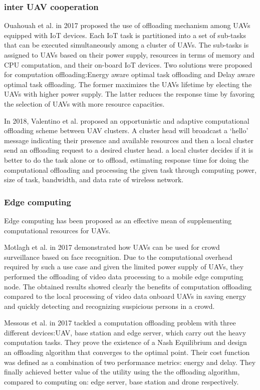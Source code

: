 \documentclass[journal]{IEEEtran}
\begin{document}
\subsubsection{inter UAV cooperation}
Ouahouah et al. in 2017 proposed the use of offloading mechanism among UAVs equipped with IoT devices\cite{Ouahouah2017}.
Each IoT task is partitioned into a set of sub-tasks that can be executed simultaneously among a cluster of UAVs.
The sub-tasks is assigned to UAVs based on their power supply, resources in terms of memory and CPU computation, and their on-board IoT devices.
Two solutions were proposed for  computation offloading:Energy aware optimal task offloading and Delay aware optimal task offloading.
The former maximizes the UAVs lifetime by electing the UAVs with higher power supply.
The latter reduces the response time by favoring the selection of UAVs with more resource capacities.

In 2018, Valentino et al. proposed an opportunistic and adaptive computational offloading scheme between UAV clusters\cite{Valentino2018}.
A cluster head will broadcast a ‘hello’ message indicating their presence and available resources and then a local cluster send an offloading request to a desired cluster head.
a local cluster decides if it is better to do the task alone or to offload, estimating response time for doing the computational offloading and processing the given task through computing power, size of task, bandwidth, and data rate of wireless network.

\subsubsection{Edge computing}
Edge computing has been proposed as an effective mean of supplementing computational resources for UAVs\cite{Motlagh2017,Messous2017}.

Motlagh et al. in 2017 demonstrated how UAVs can be used for crowd surveillance based on face recognition. 
Due to the computational overhead required by such a use case and given the limited power supply of UAVs, they performed the offloading of video data processing to a mobile edge computing node.
The obtained results showed clearly the benefits of computation offloading compared to the local processing of video data onboard UAVs in saving energy and quickly detecting and recognizing suspicious persons in a crowd.

Messous et al. in 2017 tackled a computation offloading problem with three different devices:UAV, base station and edge server, which carry out the heavy computation tasks.
They prove the existence of a Nash Equilibrium and design an offloading algorithm that converges to the optimal point.
Their cost function was defined as a combination of two performance metrics: energy and delay.
They finally achieved better value of the utility using the the offloading algorithm, compared to computing on: edge server, base station and drone respectively.
%
%
%
%
%
%
%
%
%
%
%
%
%
\end{document}
